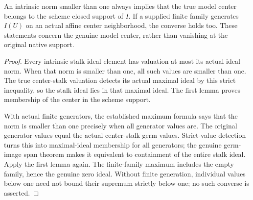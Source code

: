 \begin{theorem}
\label{scheme:model-ideal-strict-center-criterion}
\leanok
{}
An intrinsic norm smaller than one always implies that the true model
center belongs to the scheme closed support of $I$. If a supplied finite
family generates $I(U)$ on an actual affine center neighborhood, the
converse holds too. These statements concern the genuine model center,
rather than vanishing at the original native support.
\end{theorem}
\begin{proof}
Every intrinsic stalk ideal element has valuation at most its actual ideal
norm. When that norm is smaller than one, all such values are smaller
than one. The true center-stalk valuation detects its actual maximal
ideal by this strict inequality, so the stalk ideal lies in that maximal
ideal. The first lemma proves membership of the center in the scheme support.

With actual finite generators, the established maximum formula says that
the norm is smaller than one precisely when all generator values are.
The original generator values equal the actual center-stalk germ values.
Strict-value detection turns this into maximal-ideal membership for all
generators; the genuine germ-image span theorem makes it equivalent to
containment of the entire stalk ideal. Apply the first lemma again. The
finite-family maximum includes the empty family, hence the genuine zero
ideal. Without finite generation, individual values below one need not
bound their supremum strictly below one; no such converse is asserted.
\end{proof}
